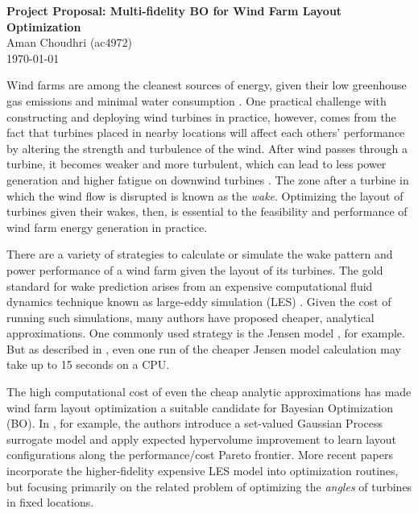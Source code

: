 \documentclass[12pt]{article}
\begin{document}
\begin{flushleft}
\textbf{Project Proposal: Multi-fidelity BO for Wind Farm Layout Optimization} \\
Aman Choudhri (ac4972) \\
\today
\end{flushleft}

\vspace{0.1in}

Wind farms are among the cleanest sources of energy, given their low greenhouse
gas emissions and minimal water consumption \cite{chughWindFarmLayout2022}. One
practical challenge with constructing and deploying wind turbines in practice,
however, comes from the fact that turbines placed in nearby locations will
affect each others' performance by altering the strength and turbulence of the
wind. After wind passes through a turbine, it becomes weaker and more
turbulent, which can lead to less power generation and higher fatigue on
downwind turbines \cite{hellanBayesianOptimisationClimate2023}. The zone after a turbine
in which the wind flow is disrupted is known as the \emph{wake}. Optimizing the
layout of turbines given their wakes, then, is essential to the feasibility and performance of
wind farm energy generation in practice.

There are a variety of strategies to calculate or simulate the wake pattern and
power performance of a wind farm given the layout of its turbines. The gold
standard for wake prediction arises from an expensive computational fluid
dynamics technique known as large-eddy simulation (LES)
\cite{niayifarAnalyticalModelingWind2016}. Given the cost of running such
simulations, many authors have proposed cheaper, analytical approximations. One
commonly used strategy is the Jensen model
\cite{jimenezApplicationTechniqueCharacterize2010}, for example. But as described
in \cite{bliekEXPObenchBenchmarkingSurrogatebased2023}, even one run of the cheaper
Jensen model calculation may take up to 15 seconds on a CPU.

The high computational cost of even the cheap analytic approximations has made wind
farm layout optimization a suitable candidate for Bayesian Optimization (BO).
In \cite{chughWindFarmLayout2022}, for example, the authors introduce a
set-valued Gaussian Process surrogate model and apply expected hypervolume
improvement to learn layout configurations along the performance/cost Pareto
frontier. More recent papers \cite{bempedelisDatadrivenOptimisationWind2024}
\cite{moleMultiFidelityBayesianOptimisation2024} incorporate the
higher-fidelity expensive LES model into optimization routines, but focusing primarily
on the related problem of optimizing the \emph{angles} of turbines in fixed locations.
\end{document}
